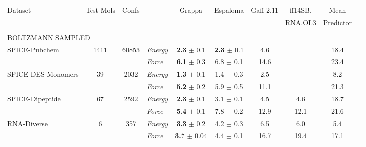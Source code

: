 \documentclass[varwidth]{standalone}
\newcommand{\widthbetweentype}{7pt}
\begin{document}
\begin{adjustbox}{width=\textwidth,center}
\centering

\renewcommand{\arraystretch}{1.0} %


\begin{tabular}{l c c l c c c c c c}

\hline
\hline
\multirow{2}{*}{Dataset} & \multirow{2}{*}{Test Mols} & \multirow{2}{*}{Confs} & & \multirow{2}{*}{Grappa} & \multirow{2}{*}{Espaloma} & \multirow{2}{*}{Gaff-2.11} & ff14SB, & Mean\\
& & & & & & & RNA.OL3 & Predictor\\
\hline
\multicolumn{8}{l}{\vspace{\widthbetweentype}} \\[-1em]
\multicolumn{8}{l}{\small{BOLTZMANN SAMPLED}} \\\hline
\multirow{2}{*}{SPICE-Pubchem} & \multirow{2}{*}{1411} & \multirow{2}{*}{60853} & \textit{Energy} & \textbf{2.3} $\pm$ 0.1 & \textbf{2.3} $\pm$ 0.1 & 4.6 &  & 18.4\\
                                   &                       &                         & \textit{Force}  & \textbf{6.1} $\pm$ 0.3 & 6.8 $\pm$ 0.1 & 14.6 &  & 23.4\\
\hline
\multirow{2}{*}{SPICE-DES-Monomers} & \multirow{2}{*}{39} & \multirow{2}{*}{2032} & \textit{Energy} & \textbf{1.3} $\pm$ 0.1 & 1.4 $\pm$ 0.3 & 2.5 &  & 8.2\\
                                   &                       &                         & \textit{Force}  & \textbf{5.2} $\pm$ 0.2 & 5.9 $\pm$ 0.5 & 11.1 &  & 21.3\\
\hline
\multirow{2}{*}{SPICE-Dipeptide} & \multirow{2}{*}{67} & \multirow{2}{*}{2592} & \textit{Energy} & \textbf{2.3} $\pm$ 0.1 & 3.1 $\pm$ 0.1 & 4.5 & 4.6 & 18.7\\
                                   &                       &                         & \textit{Force}  & \textbf{5.4} $\pm$ 0.1 & 7.8 $\pm$ 0.2 & 12.9 & 12.1 & 21.6\\
\hline
\multirow{2}{*}{RNA-Diverse} & \multirow{2}{*}{6} & \multirow{2}{*}{357} & \textit{Energy} & \textbf{3.3} $\pm$ 0.2 & 4.2 $\pm$ 0.3 & 6.5 & 6.0 & 5.4\\
                                   &                       &                         & \textit{Force}  & \textbf{3.7} $\pm$ 0.04 & 4.4 $\pm$ 0.1 & 16.7 & 19.4 & 17.1\\

\end{tabular}
\end{adjustbox}
\end{document}
